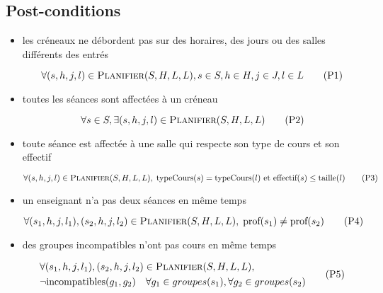 \subsection{Post-conditions}

\begin{itemize}

    \item les créneaux ne débordent pas sur des horaires, des jours ou des
        salles différents des entrés

        \begin{equation}\label{eqn:p1}
            \forall(s, h, j, l) \in \textsc{Planifier}(S, H, L, L),
            s \in S, h \in H, j \in J, l \in L
            \tag{P1}
        \end{equation}

    \item toutes les séances sont affectées à un créneau

        \begin{equation}\label{eqn:p2}
            \forall s \in S,
            \exists(s, h, j, l) \in \textsc{Planifier}(S, H, L, L)
            \tag{P2}
        \end{equation}

    \item toute séance est affectée à une salle qui respecte son type de cours
        et son effectif

        \begin{equation}\label{eqn:p3}
            \forall(s, h, j, l) \in \textsc{Planifier}(S, H, L, L),\;
            \text{typeCours}(s) = \text{typeCours}(l)
            \  \text{et} \  \text{effectif}(s) \leq \text{taille}(l)
            \tag{P3}
        \end{equation}

    \item un enseignant n'a pas deux séances en même temps

        \begin{equation}\label{eqn:p4}
            \forall(s_1, h, j, l_1), (s_2, h, j, l_2)
            \in \textsc{Planifier}(S, H, L, L),\;
            \text{prof}(s_1) \not= \text{prof}(s_2)
            \tag{P4}
        \end{equation}

    \item des groupes incompatibles n'ont pas cours en même temps

        \begin{equation}\label{eqn:p5}
            \begin{split}
                & \forall(s_1, h, j, l_1), (s_2, h, j, l_2)
                \in \textsc{Planifier}(S, H, L, L),\;\\
                & \lnot\text{incompatibles}(g_1, g_2)
                \quad \forall g_1 \in groupes(s_1), \forall g_2 \in groupes(s_2)
            \end{split}
            \tag{P5}
        \end{equation}


\end{itemize}
